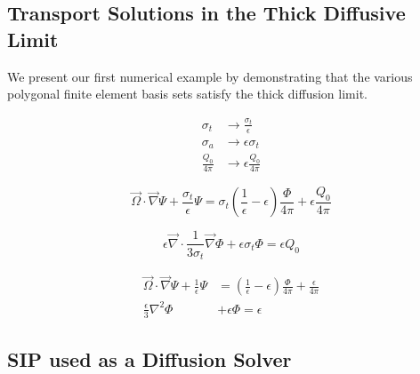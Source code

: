 \subsection{Transport Solutions in the Thick Diffusive Limit}
\label{sec::DSA_Results_TDL}

We present our first numerical example by demonstrating that the various polygonal finite element basis sets satisfy the thick diffusion limit. 


\begin{equation}
\label{eq::BF_Results_TDL_scaling}
\begin{aligned}
	\sigma_t &\rightarrow \frac{\sigma_t}{\epsilon} \\
	\sigma_a &\rightarrow \epsilon \sigma_t\\
	\frac{Q_0}{4 \pi} &\rightarrow \epsilon \frac{Q_0}{4 \pi}
\end{aligned}
\end{equation}

\begin{equation}
\label{eq::BF_Results_TDL_scaled_trans_eq}
\vec{\Omega} \cdot \vec{\nabla} \Psi + \frac{\sigma_t}{\epsilon} \Psi = \sigma_t \left( \frac{1}{\epsilon} - \epsilon   \right)  \frac{\Phi}{4 \pi} + \epsilon \frac{Q_0}{4 \pi}
\end{equation}

\begin{equation}
\label{eq::BF_Results_TDL_scaled_diff_eq}
\epsilon \vec{\nabla} \cdot \frac{1}{3 \sigma_t}  \vec{\nabla} \Phi + \epsilon \sigma_t \Phi =  \epsilon Q_0
\end{equation}

\begin{equation}
\label{eq::BF_Results_TDL_normalized_eqs}
\begin{aligned}
\vec{\Omega} \cdot \vec{\nabla} \Psi + \frac{1}{\epsilon} \Psi &=  \left( \frac{1}{\epsilon} - \epsilon   \right)  \frac{\Phi}{4 \pi} +  \frac{\epsilon}{4 \pi} \\
\frac{\epsilon}{3} {\nabla}^2 \Phi &+ \epsilon  \Phi =  \epsilon 
\end{aligned}
\end{equation}

\subsection{SIP used as a Diffusion Solver}
\label{sec::DSA_Results_SIP}

